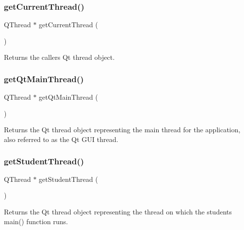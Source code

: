 \subsubsection{\texorpdfstring{get\+Current\+Thread()}{getCurrentThread()}}
{\footnotesize\ttfamily Q\+Thread $\ast$ get\+Current\+Thread (\begin{DoxyParamCaption}{ }\end{DoxyParamCaption})\hspace{0.3cm}{\ttfamily [static]}}



Returns the caller\textquotesingle{}s Qt thread object. 

\mbox{\label{classGThread_ad1309b5071a8c56775d3c82a6d8ccd4d}} 
\subsubsection{\texorpdfstring{get\+Qt\+Main\+Thread()}{getQtMainThread()}}
{\footnotesize\ttfamily Q\+Thread $\ast$ get\+Qt\+Main\+Thread (\begin{DoxyParamCaption}{ }\end{DoxyParamCaption})\hspace{0.3cm}{\ttfamily [static]}}



Returns the Qt thread object representing the main thread for the application, also referred to as the Qt G\+UI thread. 

\mbox{\label{classGThread_ad230888eab766cd189ab09365776c41e}} 
\subsubsection{\texorpdfstring{get\+Student\+Thread()}{getStudentThread()}}
{\footnotesize\ttfamily Q\+Thread $\ast$ get\+Student\+Thread (\begin{DoxyParamCaption}{ }\end{DoxyParamCaption})\hspace{0.3cm}{\ttfamily [static]}}



Returns the Qt thread object representing the thread on which the student\textquotesingle{}s main() function runs. 

